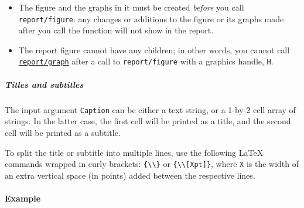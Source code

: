 \begin{itemize}
\item
  The figure and the graphs in it must be created \emph{before} you call
  \texttt{report/figure}: any changes or additions to the figure or its
  graphs made after you call the function will not show in the report.
\item
  The report figure cannot have any children; in other words, you cannot
  call \href{report/graph}{\texttt{report/graph}} after a call to
  \texttt{report/figure} with a graphics handle, \texttt{H}.
\end{itemize}

\subparagraph{Titles and subtitles}\label{titles-and-subtitles}

The input argument \texttt{Caption} can be either a text string, or a
1-by-2 cell array of strings. In the latter case, the first cell will be
printed as a title, and the second cell will be printed as a subtitle.

To split the title or subtitle into multiple lines, use the following
LaTeX commands wrapped in curly brackets:
\texttt{\{\textbackslash{}\textbackslash{}\}} or
\texttt{\{\textbackslash{}\textbackslash{}{[}Xpt{]}\}}, where \texttt{X}
is the width of an extra vertical space (in points) added between the
respective lines.

\paragraph{Example}\label{example}



